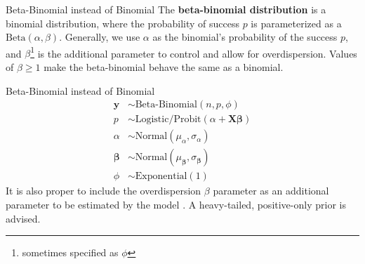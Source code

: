 \begin{frame}{Beta-Binomial instead of Binomial}
	The \textbf{beta-binomial distribution} is a binomial distribution, where
	the probability of success $p$ is parameterized as a $\text{Beta}(\alpha, \beta)$.
	\vfill
	Generally, we use $\alpha$ as the binomial's probability of the success $p$,
	and $\beta$\footnote{sometimes specified as $\phi$} is the additional parameter
	to control and allow for overdispersion.
	\vfill
	Values of $\beta \geq 1$ make the beta-binomial behave the same as a binomial.
\end{frame}

\begin{frame}{Beta-Binomial instead of Binomial}
	$$
		\begin{aligned}
			\mathbf{y}         & \sim \text{Beta-Binomial}(n, p, \phi)                                     \\
			p                  & \sim \text{Logistic/Probit}(\alpha +  \mathbf{X} \boldsymbol{\beta})      \\
			\alpha             & \sim \text{Normal}(\mu_\alpha, \sigma_\alpha)                             \\
			\boldsymbol{\beta} & \sim \text{Normal}(\mu_{\boldsymbol{\beta}}, \sigma_{\boldsymbol{\beta}}) \\
			\phi               & \sim \text{Exponential}(1)
		\end{aligned}
	$$
	\vfill
	It is also proper to include the overdispersion $\beta$ parameter as an
	additional parameter to be estimated by the model
	\parencite{gelman2013bayesian,mcelreath2020statistical}.
	A heavy-tailed, positive-only prior is advised.
\end{frame}

